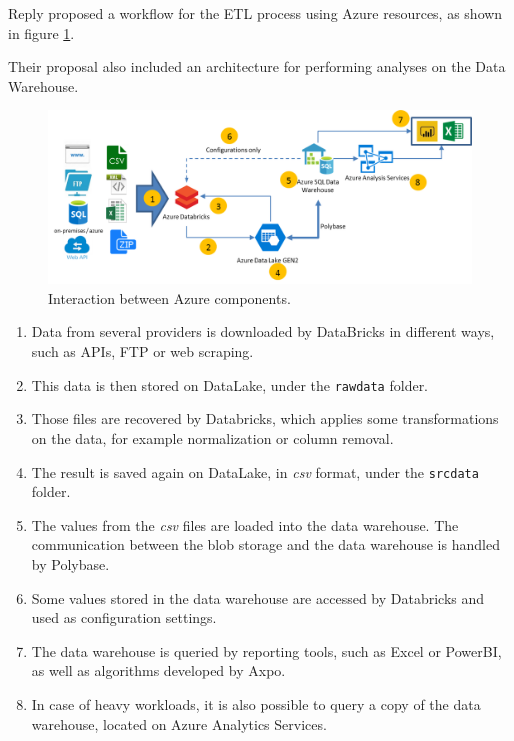Reply proposed a workflow for the ETL process using Azure resources, as shown in figure \ref{fig:azure:workflow}.

Their proposal also included an architecture for performing analyses on the Data Warehouse.

\begin{figure}
    \centering
    \includegraphics[width=\textwidth]{res/azure/workflow.png}
    \caption{Interaction between Azure components.}
    \label{fig:azure:workflow}
\end{figure}

\begin{enumerate}
    \item Data from several providers is downloaded by DataBricks in different ways, such as APIs, FTP or web scraping.
    \item This data is then stored on DataLake, under the \texttt{rawdata} folder.
    \item Those files are recovered by Databricks, which applies some transformations on the data, for example normalization or column removal.
    \item The result is saved again on DataLake, in \textit{csv} format, under the \texttt{srcdata} folder.
    \item The values from the \textit{csv} files are loaded into the data warehouse. The communication between the blob storage and the data warehouse is handled by Polybase.
    \item Some values stored in the data warehouse are accessed by Databricks and used as configuration settings.
    \item The data warehouse is queried by reporting tools, such as Excel or PowerBI, as well as algorithms developed by Axpo.
    \item In case of heavy workloads, it is also possible to query a copy of the data warehouse, located on Azure Analytics Services.
\end{enumerate}

